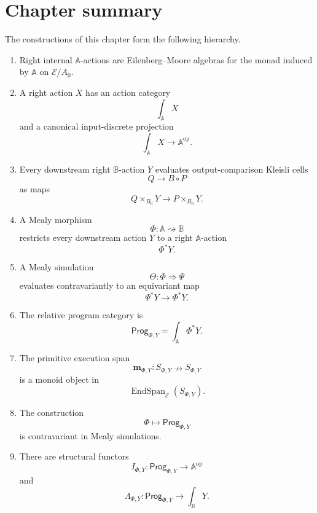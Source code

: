 \section{Chapter summary}
\label{sec:relative-summary}

\begin{theorem}
\label{thm:relative-mealy-dynamic-span-logic}
The constructions of this chapter form the following hierarchy.

\begin{enumerate}
\item Right internal \(\mathbb A\)-actions are Eilenberg--Moore algebras for
the monad induced by \(\mathbb A\) on \(\mathcal E/A_0\).

\item A right action \(X\) has an action category
\[
\int_{\mathbb A}X
\]
and a canonical input-discrete projection
\[
\int_{\mathbb A}X\to\mathbb A^{\mathrm{op}}.
\]

\item Every downstream right \(\mathbb B\)-action \(Y\) evaluates
output-comparison Kleisli cells
\[
Q\to B\circ P
\]
as maps
\[
Q\times_{B_0}Y\to P\times_{B_0}Y.
\]

\item A Mealy morphism
\[
\Phi:\mathbb A\rightsquigarrow\mathbb B
\]
restricts every downstream action \(Y\) to a right \(\mathbb A\)-action
\[
\Phi^\ast Y.
\]

\item A Mealy simulation
\[
\Theta:\Phi\Rightarrow\Psi
\]
evaluates contravariantly to an equivariant map
\[
\Psi^\ast Y\to\Phi^\ast Y.
\]

\item The relative program category is
\[
\mathsf{Prog}_{\Phi,Y}
=
\int_{\mathbb A}\Phi^\ast Y.
\]

\item The primitive execution span
\[
\mathbf m_{\Phi,Y}:S_{\Phi,Y}\nrightarrow S_{\Phi,Y}
\]
is a monoid object in
\[
\operatorname{EndSpan}_{\mathcal E}(S_{\Phi,Y}).
\]

\item The construction
\[
\Phi\longmapsto\mathsf{Prog}_{\Phi,Y}
\]
is contravariant in Mealy simulations.

\item There are structural functors
\[
I_{\Phi,Y}:\mathsf{Prog}_{\Phi,Y}\to\mathbb A^{\mathrm{op}}
\]
and
\[
\Lambda_{\Phi,Y}:\mathsf{Prog}_{\Phi,Y}\to\int_{\mathbb B}Y.
\]


\end{enumerate}
\end{theorem}
